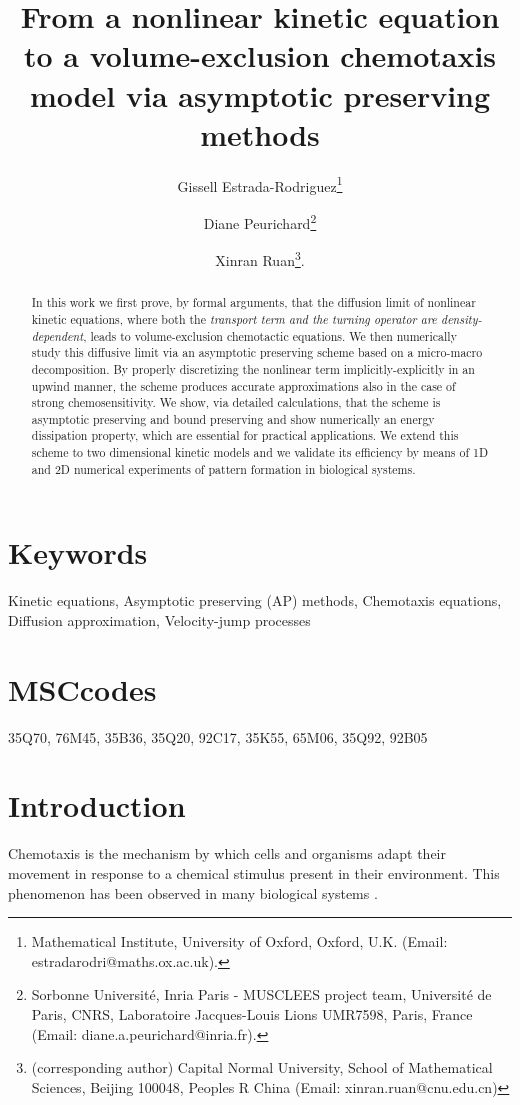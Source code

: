 \documentclass{article}
\title{From a nonlinear kinetic equation to a volume-exclusion chemotaxis model via asymptotic preserving methods}
\author{Gissell Estrada-Rodriguez\thanks{Mathematical Institute, University of Oxford, Oxford, U.K. 
(Email: {estradarodri@maths.ox.ac.uk}).}
\and Diane Peurichard\thanks{ Sorbonne Universit\'e, Inria Paris - MUSCLEES project team, Universit\'e de Paris, CNRS, Laboratoire Jacques-Louis Lions UMR7598, Paris, France (Email: {diane.a.peurichard@inria.fr}).}
\and Xinran Ruan\thanks{(corresponding author) Capital Normal University, School of Mathematical Sciences, Beijing 100048, Peoples R China
(Email: {xinran.ruan@cnu.edu.cn})}.}
\begin{document}
\maketitle

\begin{abstract}
In this work we first prove, by formal arguments, that the diffusion limit of nonlinear kinetic equations, where both the \textit{transport term and the turning operator are density-dependent}, leads to volume-exclusion chemotactic equations. We then numerically study this diffusive limit via an asymptotic preserving scheme based on a micro-macro decomposition. By properly discretizing the nonlinear term implicitly-explicitly in an upwind manner, the scheme produces accurate approximations also in the case of strong chemosensitivity. We show, via detailed calculations, that the scheme is asymptotic preserving and {{bound preserving}} and show numerically an {energy dissipation} property, which are essential for practical applications. We extend this scheme to two dimensional kinetic models and we  validate its efficiency by means of 1D and 2D numerical experiments of pattern formation in biological systems.
\end{abstract}

\section*{Keywords}
Kinetic equations, Asymptotic preserving (AP) methods, Chemotaxis equations, Diffusion approximation, Velocity-jump processes


\section*{MSCcodes}
35Q70, 76M45, 35B36, 35Q20, 92C17, 35K55, 65M06, 35Q92, 92B05

\section{Introduction}
Chemotaxis is the mechanism by which cells and organisms adapt their movement in response to a chemical stimulus present in their environment. This phenomenon has been observed in many biological systems \cite{Alt1980,Kaupp2012,Jin2008,Roussos2011}. 
\end{document}
